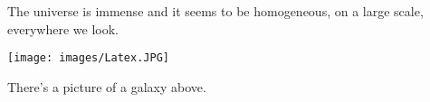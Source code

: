 \documentclass{article}
\begin{document}
The universe is immense and it seems to be homogeneous, 
on a large scale, everywhere we look.

\texttt{[image: images/Latex.JPG]}  
 
There's a picture of a galaxy above.
\end{document}
